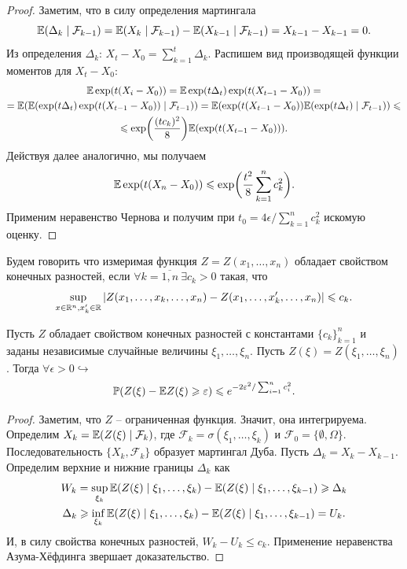 \begin{proof}
    Заметим, что в силу определения мартингала 
    \[\mathbb{E}(\Delta_k \mid \mathcal{F}_{k - 1}) = \mathbb{E}(X_k \mid \mathcal{F}_{k - 1}) - \mathbb{E}(X_{k - 1}\mid \mathcal{F}_{k - 1}) = X_{k - 1} - X_{k - 1} = 0.\]
    Из определения $\Delta_k$: $X_t - X_0 = \sum_{k = 1}^t \Delta_k$. Распишем вид производящей функции моментов для $X_t - X_0$:
    \begin{multline*}
        \mathbb{E} \exp({t(X_i - X_0)}) = \mathbb{E} \exp({t\Delta_t})\exp({t(X_{t - 1} - X_0)}) = \\ = \mathbb{E}(\mathbb{E}(\exp({t\Delta_t})\exp({t(X_{t - 1} - X_0)}) \mid \mathcal{F}_{t - 1})) =  \mathbb{E}(\exp({t(X_{t - 1}- X_0)})\mathbb{E}(\exp({t\Delta_t})\mid \mathcal{F}_{t - 1})) \leqslant \\ \leqslant
        \exp\biggr({\frac{(tc_k)^2}{8}}\biggr)\mathbb{E}(\exp({t(X_{t - 1} - X_0)})).
    \end{multline*}
    Действуя далее аналогично, мы получаем 
    \[
        \mathbb{E} \exp({t(X_n - X_0)}) \leqslant \exp\biggr({\frac{t^2}{8}\sum_{k = 1}^n c_k^2}\biggr).
    \]
    Применим неравенство Чернова и получим при $t_0 = {4\epsilon}/{\sum_{k = 1}^n c_k^2}$ искомую оценку.
\end{proof}
\begin{definition}
    Будем говорить что измеримая функция $Z = Z(x_1, \ldots, x_n)$ обладает свойством конечных разностей, если $\forall k = \overline{1, n}\  \exists c_k > 0$ такая, что
    \[
        \sup\limits_{x \in \mathbb{R}^n, x'_k \in \mathbb{R}}|Z(x_1, \ldots, x_k, \ldots, x_n) - Z(x_1, \ldots, x_k', \ldots, x_n)| \leqslant c_k.
    \]
\end{definition}
\begin{theorem}
    Пусть $Z$ обладает свойством конечных разностей с константами $\{c_k\}_{k = 1}^n$ и заданы независимые случайные величины $\xi_1, \ldots, \xi_n$. Пусть $Z(\xi) = Z(\xi_1, \ldots, \xi_n)$. Тогда $\forall \epsilon > 0 \hookrightarrow$
    \[
        \mathbb{P}(Z(\xi) - \mathbb{E} Z(\xi) \geqslant \varepsilon) \leqslant e^{-{2\varepsilon^2}/\sum_{i = 1}^n c_i^2}.
    \]
\end{theorem}
\begin{proof}
    Заметим, что $Z$ -- ограниченная функция. Значит, она интегрируема.
    Определим $X_k = \mathbb{E}(Z(\xi)\mid\mathcal{F}_k)$, где $\mathcal{F}_k = \sigma(\xi_1, \ldots, \xi_k)$ и $\mathcal{F}_0 = \{\emptyset, \Omega\}$. Последовательность $\{X_k, \mathcal{F}_k\}$ образует мартингал Дуба. Пусть $\Delta_k = X_k - X_{k - 1}$. Определим верхние и нижние границы $\Delta_k$ как 
    \begin{multline*}
        W_k = \sup\limits_{\xi_k} \mathbb{E}(Z(\xi)\mid \xi_1, \ldots, \xi_k) - \mathbb{E}(Z(\xi) \mid \xi_1, \ldots, \xi_{k - 1}) \geqslant \Delta_k \\ \Delta_k \geqslant \inf\limits_{\xi_k} \mathbb{E}(Z(\xi)\mid \xi_1, \ldots, \xi_k) - \mathbb{E}(Z(\xi) \mid \xi_1, \ldots, \xi_{k - 1}) = U_k.
    \end{multline*}
    И, в силу свойства конечных разностей, $W_k - U_k \leq c_k$. Применение неравенства Азума-Хёфдинга звершает доказательство.
\end{proof}
